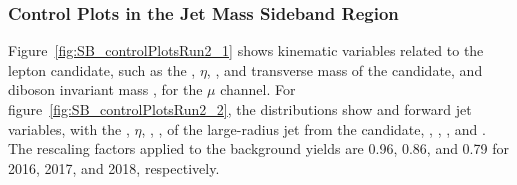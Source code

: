 \subsubsection{Control Plots in the Jet Mass Sideband Region}

Figure~\ref{fig:SB_controlPlotsRun2_1} shows kinematic variables related to the lepton candidate, such as the \pt, $\eta$, \ptmiss, \pt and transverse mass of the \Wlep candidate, and diboson invariant mass \MVV, for the $\mu$ channel.
For figure~\ref{fig:SB_controlPlotsRun2_2}, the distributions show \Vhad and \VBF forward jet variables, with the \pt, $\eta$, \MJ, \nsubjDDT, \DoubleB of the large-radius jet from the \Vhad candidate, \DetaVBF, \mjjVBF, \nJets, and \Dy.
The rescaling factors applied to the \Wjets background yields are 0.96, 0.86, and 0.79 for 2016, 2017, and 2018, respectively.


